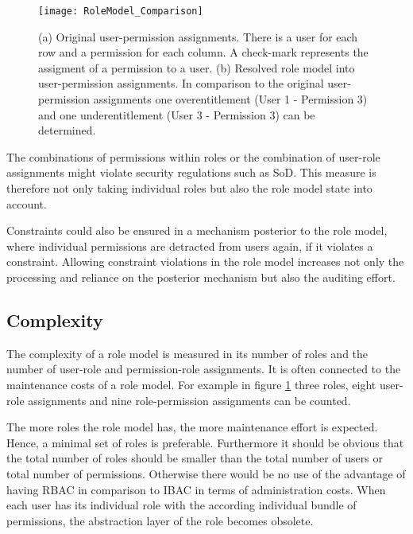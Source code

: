         \begin{figure}[H]
            \centering
            \texttt{[image: RoleModel\_Comparison]}
            \caption{(a) Original user-permission assignments. There is a user for each row and a permission for each column. A check-mark represents the assigment of a permission to a user. (b) Resolved role model into user-permission assignments. In comparison to the original user-permission assignments one overentitlement (User 1 - Permission 3) and one underentitlement (User 3 - Permission 3) can be determined.}
            \label{fig:rolemodelComparison}
        \end{figure}
        
        The combinations of permissions within roles or the combination of user-role assignments might violate security regulations such as SoD. This measure is therefore not only taking individual roles but also the role model state into account.
        
        Constraints could also be ensured in a mechanism posterior to the role model, where individual permissions are detracted from users again, if it violates a constraint. Allowing constraint violations in the role model increases not only the processing and reliance on the posterior mechanism but also the auditing effort.
        
        \subsection{Complexity}
        \label{sec:complexity}
        The complexity of a role model is measured in its number of roles and the number of user-role and permission-role assignments. It is often connected to the maintenance costs of a role model. For example in figure \ref{fig:rolemodelComparison} three roles, eight user-role assignments and nine role-permission assignments can be counted.
        
        The more roles the role model has, the more maintenance effort is expected. Hence, a minimal set of roles is preferable. Furthermore it should be obvious that the total number of roles should be smaller than the total number of users or total number of permissions. Otherwise there would be no use of the advantage of having RBAC in comparison to IBAC in terms of administration costs. When each user has its individual role with the according individual bundle of permissions, the abstraction layer of the role becomes obsolete.
        
